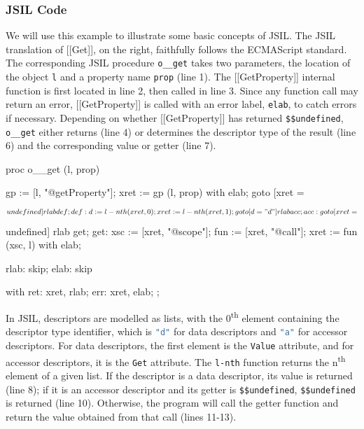 \documentclass[a4paper,11pt,twoside]{report}
\def\jsinline{\lstinline[language=JavaScript, basicstyle=\small]}%\end{lstlisting}
\def\jsilinline{\lstinline[language=JSIL, basicstyle=\small]}%\end{lstlisting}
\begin{document}
\subsubsection{JSIL Code}

\begin{minipage}{0.55\textwidth}
We will use this example to illustrate some basic concepts of JSIL. The JSIL translation of [[Get]], on the right, faithfully follows the ECMAScript standard. The corresponding JSIL procedure \jsilinline|o__get| takes two parameters, the location of the object \jsilinline|l| and a property name \jsilinline|prop| (line 1). The [[GetProperty]] internal function is first located in line 2, then called in line 3. Since any function call may return an error, [[GetProperty]] is called with an error label, \jsilinline|elab|, to catch errors if necessary. Depending on whether [[GetProperty]] has returned \jsilinline|$$undefined|, \jsilinline|o__get| either returns (line 4) or determines the descriptor type of the result (line 6) and the corresponding value or getter (line 7).
\end{minipage} \qquad
\begin{minipage}{0.45\textwidth}
\begin{lstjsil}
proc o__get (l, prop) {
				gp := [l, "@getProperty"];
				xret := gp (l, prop) with elab;	
				goto [xret = $$undefined] rlab def;
			
	def:	d := l-nth (xret, 0);
				xret := l-nth (xret, 1);
				goto [d = "d"] rlab acc;
			
	acc:	goto [xret = $$undefined] rlab get;
	get:	xsc := [xret, "@scope"];
				fun := [xret, "@call"];
				xret := fun (xsc, l) with elab;
			
	rlab:	skip;
	elab:	skip
}
with
{
    ret: xret, rlab;
    err: xret, elab;
};
\end{lstjsil}
\end{minipage}

\noindent  In JSIL, descriptors are modelled as lists, with the 0\textsuperscript{th} element containing the descriptor type identifier, which is \jsinline|"d"| for data descriptors and \jsinline|"a"| for accessor descriptors. For data descriptors, the first element is the \jsinline|Value| attribute, and for accessor descriptors, it is the \jsinline|Get| attribute. The \jsilinline|l-nth| function returns the n\textsuperscript{th} element of a given list. If the descriptor is a data descriptor, its value is returned (line 8); if it is an accessor descriptor and its getter is \jsilinline|$$undefined|, \jsinline|$$undefined| is returned (line 10). Otherwise, the program will call the getter function and return the value obtained from that call (lines 11-13).
\end{document}
